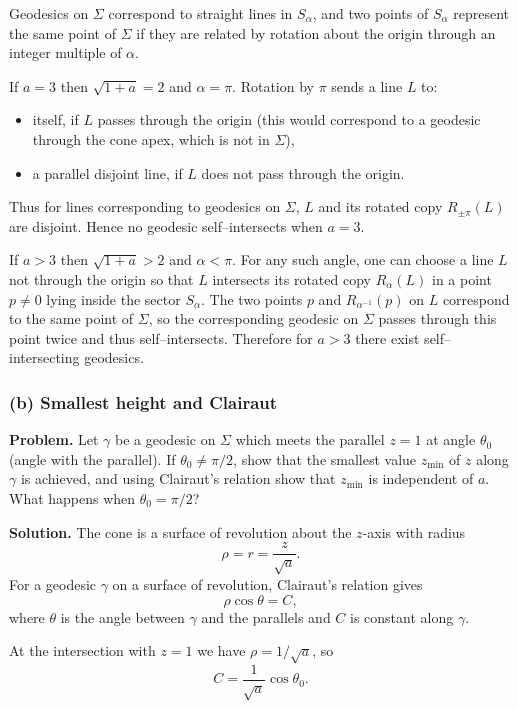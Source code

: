 \documentclass[12pt,a4paper]{article}
\theoremstyle{plain}
\theoremstyle{definition}      %
\begin{document}
Geodesics on $\Sigma$ correspond to straight lines in $S_\alpha$,
and two points of $S_\alpha$ represent the same point of $\Sigma$
if they are related by rotation about the origin through an integer
multiple of $\alpha$.

If $a=3$ then $\sqrt{1+a}=2$ and $\alpha=\pi$. Rotation by $\pi$ sends a
line $L$ to:
\begin{itemize}
	\item itself, if $L$ passes through the origin (this would correspond to
	a geodesic through the cone apex, which is not in $\Sigma$),
	\item a parallel disjoint line, if $L$ does not pass through the origin.
\end{itemize}
Thus for lines corresponding to geodesics on $\Sigma$, $L$ and its rotated
copy $R_{\pm\pi}(L)$ are disjoint. Hence no geodesic self--intersects when
$a=3$.

If $a>3$ then $\sqrt{1+a}>2$ and $\alpha<\pi$. For any such angle, one can
choose a line $L$ not through the origin so that $L$ intersects its rotated
copy $R_{\alpha}(L)$ in a point $p\neq0$ lying inside the sector $S_\alpha$.
The two points $p$ and $R_{\alpha^{-1}}(p)$ on $L$ correspond to the same
point of $\Sigma$, so the corresponding geodesic on $\Sigma$ passes through
this point twice and thus self--intersects. Therefore for $a>3$ there exist
self--intersecting geodesics.

\subsubsection*{(b) Smallest height and Clairaut}

\textbf{Problem.}
Let $\gamma$ be a geodesic on $\Sigma$ which meets the parallel $z=1$
at angle $\theta_0$ (angle with the parallel). If $\theta_0\neq\pi/2$,
show that the smallest value $z_{\min}$ of $z$ along $\gamma$ is achieved,
and using Clairaut’s relation show that $z_{\min}$ is independent of $a$.
What happens when $\theta_0=\pi/2$?

\medskip
\textbf{Solution.}
The cone is a surface of revolution about the $z$-axis with radius
\[
\rho = r = \frac{z}{\sqrt{a}}.
\]
For a geodesic $\gamma$ on a surface of revolution, Clairaut’s relation
gives
\[
\rho\cos\theta = C,
\]
where $\theta$ is the angle between $\gamma$ and the parallels and $C$ is
constant along $\gamma$.

At the intersection with $z=1$ we have $\rho = 1/\sqrt{a}$, so
\[
C = \frac{1}{\sqrt{a}}\cos\theta_0.
\tag{$*$}
\]
\end{document}
